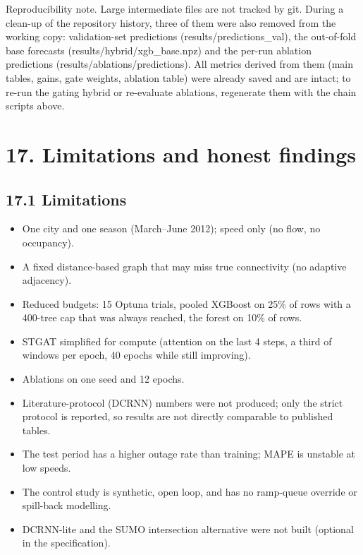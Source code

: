 \documentclass[10pt,a4paper]{article}
\begin{document}
\begin{callout}Reproducibility note. Large intermediate files are not tracked by git. During a clean-up of the repository history, three of them were also removed from the working copy: validation-set predictions (results/\allowbreak{}predictions\_\allowbreak{}val), the out-of-fold base forecasts (results/\allowbreak{}hybrid/\allowbreak{}xgb\_\allowbreak{}base.npz) and the per-run ablation predictions (results/\allowbreak{}ablations/\allowbreak{}predictions). All metrics derived from them (main tables, gains, gate weights, ablation table) were already saved and are intact; to re-run the gating hybrid or re-evaluate ablations, regenerate them with the chain scripts above.\end{callout}

\clearpage
\section*{17. Limitations and honest findings}
\subsection*{17.1 Limitations}
\begin{itemize}[nosep,leftmargin=*]
\item One city and one season (March--June 2012); speed only (no flow, no occupancy).
\item A fixed distance-based graph that may miss true connectivity (no adaptive adjacency).
\item Reduced budgets: 15 Optuna trials, pooled XGBoost on 25\% of rows with a 400-tree cap that was always reached, the forest on 10\% of rows.
\item STGAT simplified for compute (attention on the last 4 steps, a third of windows per epoch, 40 epochs while still improving).
\item Ablations on one seed and 12 epochs.
\item Literature-protocol (DCRNN) numbers were not produced; only the strict protocol is reported, so results are not directly comparable to published tables.
\item The test period has a higher outage rate than training; MAPE is unstable at low speeds.
\item The control study is synthetic, open loop, and has no ramp-queue override or spill-back modelling.
\item DCRNN-lite and the SUMO intersection alternative were not built (optional in the specification).
\end{itemize}
\end{document}
